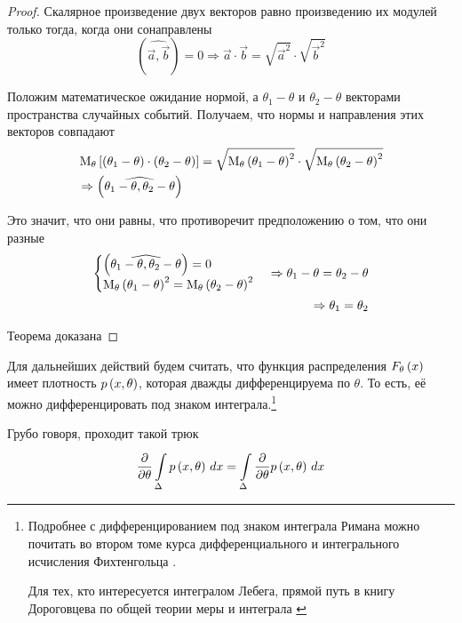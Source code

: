 \begin{proof}
    Скалярное произведение двух векторов равно произведению их модулей
    только тогда, когда они сонаправлены
    $$\left(\widehat{\vec{a},\vec{b}}\right)=0
        \Rightarrow \vec{a}\cdot\vec{b}
        =\sqrt{\vec{a}^2}\cdot\sqrt{\vec{b}^2}$$

    Положим математическое ожидание нормой,
    а $\theta_1-\theta$ и $\theta_2-\theta$ векторами
    пространства случайных событий.
    Получаем, что нормы и направления этих векторов совпадают
    \begin{align*}
        &\meanof{\theta}{\left[ \left( \theta_1-\theta \right)
            \cdot\left( \theta_2-\theta \right) \right]}
        =\sqrt{\meanof{\theta}{\left( \theta_1-\theta \right)^2}}
            \cdot\sqrt{\meanof{\theta}{\left( \theta_2-\theta \right)^2}}\\
        &\Rightarrow\left(\widehat{\theta_1-\theta,\theta_2-\theta}\right)\\
        \end{align*}

    Это значит, что они равны,
    что противоречит предположению о том, что они разные
    \begin{align*}
        \begin{cases}
            \left(\widehat{\theta_1-\theta,\theta_2-\theta}\right)=0\\
            \meanof{\theta}{\left( \theta_1-\theta \right)^2}
                =\meanof{\theta}{\left( \theta_2-\theta \right)^2}
        \end{cases}
        \Rightarrow \theta_1-\theta=\theta_2-\theta\\
        \Rightarrow\theta_1=\theta_2
    \end{align*}

    Теорема доказана
\end{proof}

\begin{remark}\label{remark:doubleDiff}
    Для дальнейших действий будем считать, что функция распределения
    $\cdfof{\theta}{x}$ имеет плотность $\pdf{x,\theta}$,
    которая дважды дифференцируема по $\theta$.
    То есть, её можно дифференцировать под знаком интеграла.\footnote{Подробнее
    с дифференцированием под знаком интеграла Римана можно почитать во втором
    томе курса дифференциального и интегрального исчисления Фихтенгольца
    \cite[с.~712]{Fichtenholz2}.

    Для тех, кто интересуется интегралом Лебега, прямой путь в книгу
    Дороговцева по общей теории меры и интеграла \cite[с.~102]{DorogovtsevIT}}

    Грубо говоря, проходит такой трюк
    $$\frac{\partial}{\partial \theta}\integrall{\Delta}{dx}{\pdf{x, \theta}}
        = \integrall{\Delta}{dx}{
            \frac{\partial}{\partial \theta}\pdf{x, \theta}}$$
\end{remark}

